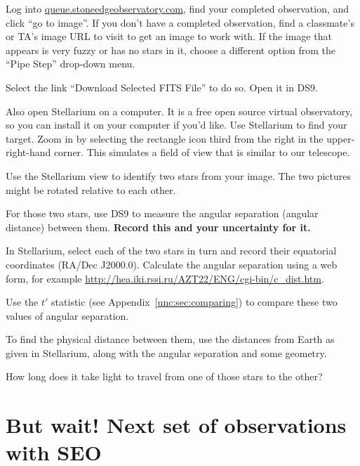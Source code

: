 \begin{steps}
	\item Log into \url{queue.stoneedgeobservatory.com}, find your completed observation, and click ``go to image''. If you don't have a completed observation, find a classmate's or TA's image URL to visit to get an image to work with. If the image that appears is very fuzzy or has no stars in it, choose a different option from the ``Pipe Step'' drop-down menu.
	
	\item Select the link ``Download Selected FITS File'' to do so. Open it in DS9.
	
	\item Also open Stellarium on a computer. It is a free open source virtual observatory, so you can install it on your computer if you'd like. Use Stellarium to find your target. Zoom in by selecting the rectangle icon third from the right in the upper-right-hand corner. This simulates a field of view that is similar to our telescope.
	
	\item Use the Stellarium view to identify two stars from your image. The two pictures might be rotated relative to each other.
	
	\item For those two stars, use DS9 to measure the angular separation (angular distance) between them. \textbf{Record this and your uncertainty for it.}
	
	\item In Stellarium, select each of the two stars in turn and record their equatorial coordinates (RA/Dec J2000.0). Calculate the angular separation using a web form, for example \url{http://hea.iki.rssi.ru/AZT22/ENG/cgi-bin/c_dist.htm}.
	
	\item Use the $t'$ statistic (see Appendix\ \ref{unc:sec:comparing}) to compare these two values of angular separation.
	
	\item To find the physical distance between them, use the distances from Earth as given in Stellarium, along with the angular separation and some geometry.
	
	\item How long does it take light to travel from one of those stars to the other?
\end{steps}

\section{But wait! Next set of observations with SEO}

